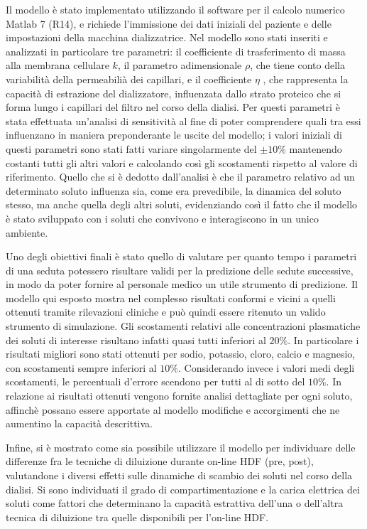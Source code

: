 Il modello è stato implementato utilizzando il software per il calcolo numerico Matlab\textsuperscript\textregistered{} 7 (R14), e richiede l'immissione dei dati iniziali del paziente e delle impostazioni della macchina dializzatrice. Nel modello sono stati inseriti e analizzati in particolare tre parametri: il coefficiente di trasferimento di massa alla membrana cellulare $k$, il parametro adimensionale $\rho$, che tiene conto della variabilità della permeabilià dei capillari, e il coefficiente $\eta$ , che rappresenta la capacità di estrazione del dializzatore, influenzata dallo strato proteico che si forma lungo i capillari del filtro nel corso della dialisi. Per questi parametri è stata effettuata un'analisi di sensitività al fine di poter comprendere quali tra essi influenzano in maniera preponderante le uscite del modello; i valori iniziali di questi parametri sono stati fatti variare singolarmente del $\pm 10\%$ mantenendo costanti tutti gli altri valori e calcolando così gli scostamenti rispetto al valore di riferimento. Quello che si è dedotto dall'analisi è che il parametro relativo ad un determinato soluto influenza sia, come era prevedibile, la dinamica del soluto stesso, ma anche quella degli altri soluti, evidenziando così il fatto che il modello è stato sviluppato con i soluti che convivono e interagiscono in un unico ambiente.

Uno degli obiettivi finali è stato quello di valutare per quanto tempo i parametri di una seduta potessero risultare validi per la predizione delle sedute successive, in modo da poter fornire al personale medico un utile strumento di predizione. Il modello qui esposto mostra nel complesso risultati conformi e vicini a quelli ottenuti tramite rilevazioni cliniche e può quindi essere ritenuto un valido strumento di simulazione. Gli scostamenti relativi alle concentrazioni plasmatiche dei soluti di interesse risultano infatti quasi tutti inferiori al $20\%$. In particolare i risultati migliori sono stati ottenuti per sodio, potassio, cloro, calcio e magnesio, con scostamenti sempre inferiori al $10\%$. Considerando invece i valori medi degli scostamenti, le percentuali d'errore scendono per tutti al di sotto del $10\%$. In relazione ai risultati ottenuti vengono fornite analisi dettagliate per ogni soluto, affinchè possano essere apportate al modello modifiche e accorgimenti che ne aumentino la capacità descrittiva.

Infine, si è mostrato come sia possibile utilizzare il modello per individuare delle differenze fra le tecniche di diluizione durante on-line HDF (pre, post), valutandone i diversi effetti sulle dinamiche di scambio dei soluti nel corso della dialisi. Si sono individuati il grado di compartimentazione e la carica elettrica dei soluti come fattori che determinano la capacità estrattiva dell'una o dell'altra tecnica di diluizione tra quelle disponibili per l'on-line HDF.
